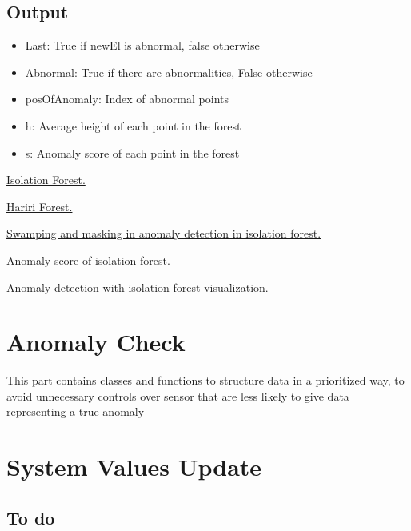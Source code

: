 \documentclass[journal]{IEEEtran}
\begin{document}
\subsection{Output}

\begin{itemize}
\item Last: True if newEl is abnormal, false otherwise
\item Abnormal: True if there are abnormalities, False otherwise
\item posOfAnomaly: Index of abnormal points
\item h: Average height of each point in the forest
\item s: Anomaly score of each point in the forest
\end{itemize}


\begin{thebibliography}{References}
\href{https://cs.nju.edu.cn/zhouzh/zhouzh.files/publication/icdm08b.pdf?q=isolation-forest}{Isolation Forest.}

 \href{http://www.ncsa.illinois.edu/Conferences/LSST18/assets/pdfs/hariri_forest.pdf}{Hariri Forest.}

 \href{https://medium.com/walmartlabs/swamping-and-masking-in-anomaly-detection-how-subsampling-in-isolation-forests-helps-mitigate-bb192a8f8dd5}{Swamping and masking in anomaly detection in isolation forest.}

 \href{https://scikit-learn.org/stable/modules/generated/sklearn.ensemble.IsolationForest.html}{Anomaly score of isolation forest.}

 \href{https://towardsdatascience.com/anomaly-detection-with-isolation-forest-visualization-23cd75c281e2}{Anomaly detection with isolation forest visualization.}

\end{thebibliography}


\section{Anomaly Check}
 
This part contains classes and functions to structure data in a prioritized way, 
to avoid unnecessary controls over sensor that are less likely to give data representing a true anomaly

\section{System Values Update}

\subsection{To do}
\end{document}
